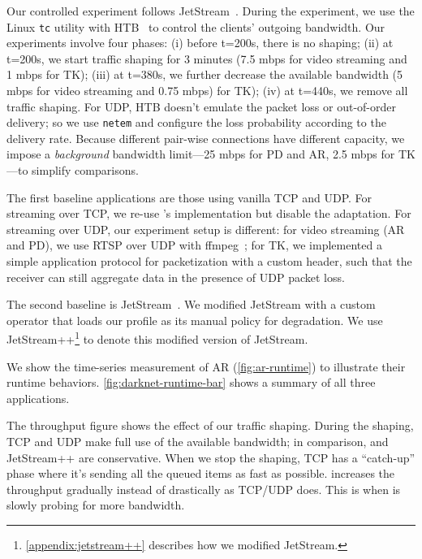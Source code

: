 Our controlled experiment follows JetStream~\cite{rabkin2014aggregation}. During
the experiment, we use the Linux \texttt{tc} utility with HTB~\cite{htb, lartc}
to control the clients' outgoing bandwidth. Our experiments involve four phases:
(i) before t=200s, there is no shaping; (ii) at t=200s, we start traffic shaping
for 3 minutes (7.5 mbps for video streaming and 1 mbps for TK); (iii) at t=380s,
we further decrease the available bandwidth (5 mbps for video streaming and 0.75
mbps) for TK); (iv) at t=440s, we remove all traffic shaping. For UDP, HTB
doesn't emulate the packet loss or out-of-order delivery; so we use
\texttt{netem} and configure the loss probability according to the delivery
rate. Because different pair-wise connections have different capacity, we impose
a \textit{background} bandwidth limit---25 mbps for PD and AR, 2.5 mbps for
TK---to simplify comparisons.

 The first baseline applications are those using vanilla TCP
and UDP. For streaming over TCP, we re-use \sysname{}'s implementation but
disable the adaptation. For streaming over UDP, our experiment setup is
different: for video streaming (AR and PD), we use RTSP over UDP with
ffmpeg~\cite{bellard2012ffmpeg}; for TK, we implemented a simple application
protocol for packetization with a custom header, such that the receiver can
still aggregate data in the presence of UDP packet loss.

The second baseline is JetStream~\cite{rabkin2014aggregation}. We modified
JetStream with a custom operator that loads our profile as its manual policy for
degradation. We use JetStream++\footnote{\autoref{appendix:jetstream++}
  describes how we modified JetStream.} to denote this modified version of
JetStream.

 We show the time-series measurement of AR
(\autoref{fig:ar-runtime}) to illustrate their runtime
behaviors. \autoref{fig:darknet-runtime-bar} shows a summary of all three
applications.

The throughput figure shows the effect of our traffic shaping. During the
shaping, TCP and UDP make full use of the available bandwidth; in comparison,
\sysname{} and JetStream++ are conservative. When we stop the shaping, TCP has a
``catch-up'' phase where it's sending all the queued items as fast as
possible. \sysname{} increases the throughput gradually instead of drastically
as TCP/UDP does. This is when \sysname{} is slowly probing for more bandwidth.

